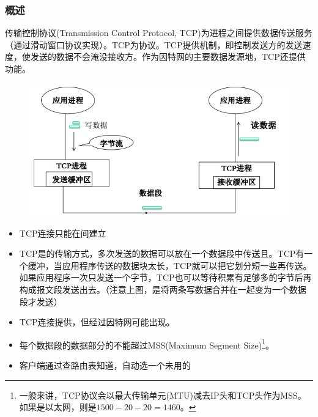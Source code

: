 \subsubsection{概述}
传输控制协议(Transmission Control Protocol, TCP)为进程之间提供数据传送服务（通过滑动窗口协议实现）。TCP为协议。TCP提供机制，即控制发送方的发送速度，使发送的数据不会淹没接收方。作为因特网的主要数据发源地，TCP还提供功能。
\begin{figure}[H]
    \centering
    \includegraphics[width=0.5\linewidth]{fig/TCP.PNG}
\end{figure}

\begin{itemize}
\item TCP连接只能在间建立
\item TCP是的传输方式，多次发送的数据可以放在一个数据段中传送且。TCP有一个缓冲，当应用程序传送的数据块太长，TCP就可以把它划分短一些再传送。如果应用程序一次只发送一个字节，TCP也可以等待积累有足够多的字节后再构成报文段发送出去。（注意上图，是将两条写数据合并在一起变为一个数据段才发送）
\item TCP连接提供，但经过因特网可能出现。
\item 每个数据段的数据部分的不能超过MSS(Maximum Segment Size)\footnote{一般来讲，TCP协议会以最大传输单元(MTU)减去IP头和TCP头作为MSS。如果是以太网，则是$1500-20-20=1460$。}。
\item 客户端通过查路由表知道，自动选一个未用的
\end{itemize}

